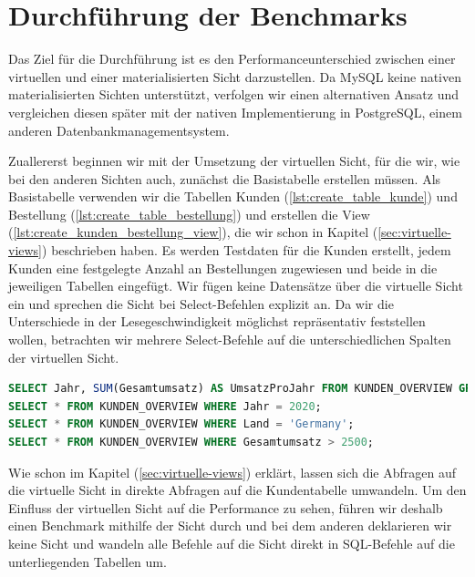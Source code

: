 \section{Durchführung der Benchmarks}\label{sec:durchfuhrung-der-benchmarks}

Das Ziel für die Durchführung ist es den Performanceunterschied zwischen einer virtuellen und einer materialisierten Sicht darzustellen.
Da MySQL keine nativen materialisierten Sichten unterstützt, verfolgen wir einen alternativen Ansatz und vergleichen diesen später mit der nativen Implementierung in PostgreSQL, einem anderen Datenbankmanagementsystem.

Zuallererst beginnen wir mit der Umsetzung der virtuellen Sicht, für die wir, wie bei den anderen Sichten auch, zunächst die Basistabelle erstellen müssen.
Als Basistabelle verwenden wir die Tabellen Kunden (\ref{lst:create_table_kunde}) und Bestellung (\ref{lst:create_table_bestellung}) und erstellen die View (\ref{lst:create_kunden_bestellung_view}), die wir schon in Kapitel (\ref{sec:virtuelle-views}) beschrieben haben.
Es werden Testdaten für die Kunden erstellt, jedem Kunden eine festgelegte Anzahl an Bestellungen zugewiesen und beide in die jeweiligen Tabellen eingefügt.
Wir fügen keine Datensätze über die virtuelle Sicht ein und sprechen die Sicht bei Select-Befehlen explizit an.
Da wir die Unterschiede in der Lesegeschwindigkeit möglichst repräsentativ feststellen wollen, betrachten wir mehrere Select-Befehle auf die unterschiedlichen Spalten der virtuellen Sicht.

\vspace{-5pt}
\begin{lstlisting}[language=SQL,caption=Select-Abfragen auf alle Spalten der View,label={lst:view-select-query}]
SELECT Jahr, SUM(Gesamtumsatz) AS UmsatzProJahr FROM KUNDEN_OVERVIEW GROUP BY Jahr;
SELECT * FROM KUNDEN_OVERVIEW WHERE Jahr = 2020;
SELECT * FROM KUNDEN_OVERVIEW WHERE Land = 'Germany';
SELECT * FROM KUNDEN_OVERVIEW WHERE Gesamtumsatz > 2500;
\end{lstlisting}
\vspace{-5pt}

Wie schon im Kapitel (\ref{sec:virtuelle-views}) erklärt, lassen sich die Abfragen auf die virtuelle Sicht in direkte Abfragen auf die Kundentabelle umwandeln.
Um den Einfluss der virtuellen Sicht auf die Performance zu sehen, führen wir deshalb einen Benchmark mithilfe der Sicht durch und bei dem anderen deklarieren wir keine Sicht und wandeln alle Befehle auf die Sicht direkt in SQL-Befehle auf die unterliegenden Tabellen um.

